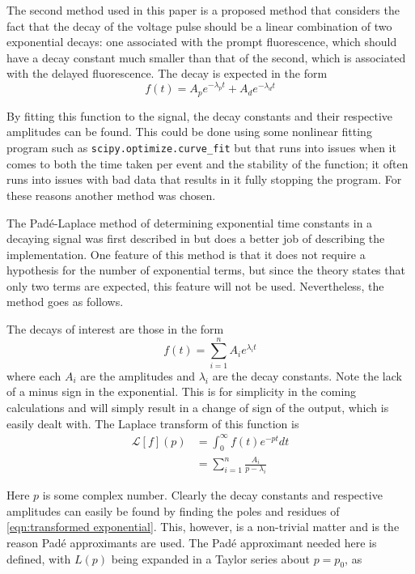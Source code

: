 \documentclass[11pt]{article}
\numberwithin{equation}{section}
\numberwithin{figure}{section}
\numberwithin{table}{section}
\begin{document}
\par The second method used in this paper is a proposed method that considers the fact that the decay of the voltage pulse should be a linear combination of two exponential decays: one associated with the prompt fluorescence, which should have a decay constant much smaller than that of the second, which is associated with the delayed fluorescence. The decay is expected in the form
\begin{equation}
    f(t)=A_pe^{-\lambda_pt}+A_de^{-\lambda_dt}
    \label{eqn:linear exponential combination}
\end{equation}
\par By fitting this function to the signal, the decay constants and their respective amplitudes can be found. This could be done using some nonlinear fitting program such as \texttt{scipy.optimize.curve\_fit} but that runs into issues when it comes to both the time taken per event and the stability of the function; it often runs into issues with bad data that results in it fully stopping the program. For these reasons another method was chosen. 
\newline
\par The Pad\'e-Laplace method of determining exponential time constants in a decaying signal was first described in \cite{Yeramian} but \cite{Hellen-Pade} does a better job of describing the implementation. One feature of this method is that it does not require a hypothesis for the number of exponential terms, but since the theory states that only two terms are expected, this feature will not be used. Nevertheless, the method goes as follows.
\par The decays of interest are those in the form
\begin{equation}
    f(t)=\sum_{i=1}^n A_i e^{\lambda_i t}
    \label{eqn:exponential decay sum}
\end{equation}
where each $A_i$ are the amplitudes and $\lambda_i$ are the decay constants. Note the lack of a minus sign in the exponential. This is for simplicity in the coming calculations and will simply result in a change of sign of the output, which is easily dealt with. The Laplace transform of this function is 
\begin{align}
    \mathcal{L}[f](p)&=\int_0^\infty f(t)e^{-pt}dt\label{eqn:laplace transform}\\
    &=\sum_{i=1}^n\frac{A_i}{p-\lambda_i}\label{eqn:transformed exponential}
\end{align}
\par Here $p$ is some complex number. Clearly the decay constants and respective amplitudes can easily be found by finding the poles and residues of \cref{eqn:transformed exponential}. This, however, is a non-trivial matter and is the reason Pad\'e approximants are used. The Pad\'e approximant needed here is defined, with $L(p)$ being expanded in a Taylor series about $p=p_0$, as
\end{document}
